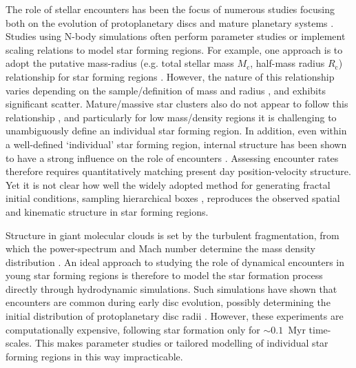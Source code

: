 \documentclass{aa}
\begin{document}
The role of stellar encounters has been the focus of numerous studies focusing both on the evolution of protoplanetary discs \citep[e.g.][]{Clarke93, Ostriker94, Pfalzner05, Winter18} and mature planetary systems \citep[e.g.][]{Spurzem09, Shara16, Winter22, Li24}. Studies using N-body simulations often perform parameter studies or implement scaling relations to model star forming regions. For example, one approach is to adopt the putative mass-radius (e.g. total stellar mass $M_\mathrm{c}$, half-mass radius $R_\mathrm{c}$) relationship for star forming regions \citep[e.g. $R_\mathrm{c} \propto M_\mathrm{c}^{1/2}$ --][]{Adams06}. However, the nature of this relationship varies depending on the sample/definition of mass and radius \citep{Pfalzner21}, and exhibits significant scatter. 
Mature/massive star clusters also do not appear to follow this relationship \citep{Krumholz19}, and particularly for low mass/density regions it is challenging to unambiguously define an individual star forming region.
In addition, even within a well-defined `individual' star forming region, internal structure has been shown to have a strong influence on the role of encounters \citep[e.g.][]{Cra13, Parker23}. 
Assessing encounter rates therefore requires quantitatively matching present day position-velocity structure. Yet it is not clear how well the widely adopted method for generating fractal initial conditions, sampling hierarchical boxes \citep{Cra13}, reproduces the observed spatial and kinematic structure in star forming regions. 


 Structure in giant molecular clouds is set by the turbulent fragmentation, from which the power-spectrum and Mach number determine the mass density distribution \citep[e.g.][]{VazquezSemadeni94, Padoan97}.
An ideal approach to studying the role of dynamical encounters in young star forming regions is therefore to model the star formation process directly through hydrodynamic simulations. 
Such simulations have shown that encounters are common during early disc evolution, possibly determining the initial distribution of protoplanetary disc radii \citep{Bate18}. 
However, these experiments are computationally expensive, following star formation only for $\sim 0.1$~Myr time-scales.
This makes parameter studies or tailored modelling of individual star forming regions in this way impracticable. 
\end{document}
